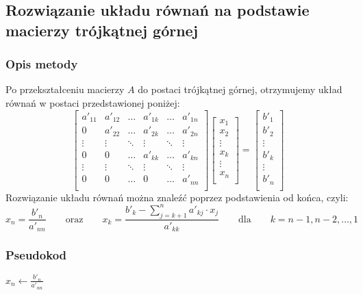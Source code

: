 \documentclass{article}
\begin{document}
\subsection{Rozwiązanie układu równań na podstawie macierzy trójkątnej górnej}
\subsubsection{Opis metody}
Po przekształceniu macierzy $A$ do postaci trójkątnej górnej, otrzymujemy układ równań w postaci przedstawionej poniżej:
$$
\begin{bmatrix}
    a'_{11} & a'_{12} & \dots & a'_{1k} & \dots & a'_{1n} \\
    0 & a'_{22} & \dots & a'_{2k} & \dots & a'_{2n} \\
    \vdots & \vdots & \ddots &\vdots & \ddots & \vdots \\
    0 & 0 & \dots & a'_{kk} & \dots & a'_{kn} \\
    \vdots & \vdots & \ddots & \vdots & \ddots & \vdots \\
    0 & 0 & \dots & 0 & \dots & a'_{nn} \\
\end{bmatrix}
\begin{bmatrix}
    x_{1} \\
    x_{2} \\
    \vdots \\
    x_{k} \\
    \vdots \\
    x_{n} \\
\end{bmatrix}
=
\begin{bmatrix}
    b'_{1} \\
    b'_{2} \\
    \vdots \\
    b'_{k} \\
    \vdots \\
    b'_{n} \\
\end{bmatrix}
$$
Rozwiązanie układu równań można znaleźć poprzez podstawienia od końca, czyli:
$$
x_n = \frac{b'_n}{a'_{nn}} \qquad \text{oraz} \qquad x_k = \frac{b'_k - \sum_{j=k+1}^{n} a'_{kj} \cdot x_j}{a'_{kk}} \qquad \text{dla} \qquad k = n-1, n-2, \dots, 1
$$
\subsubsection{Pseudokod}
\begin{algorithm}[H]
    $x_n \leftarrow \frac{b'_n}{a'_{nn}}$\;
\end{algorithm}
\end{document}
